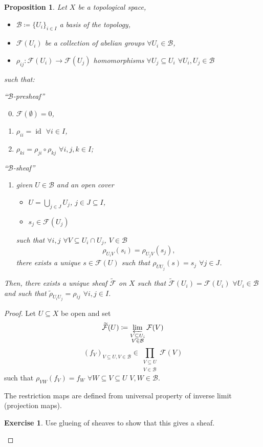 \documentclass[12pt]{article}
\DeclareMathOperator{\id}{id}
\newtheorem*{proposition}{Proposition}
\theoremstyle{definition}
\newtheorem*{exercise}{Exercise}
\theoremstyle{remark}
\begin{document}
\begin{proposition}
Let $X$ be a topological space,
\begin{itemize}
\item $\mathcal{B}\coloneqq\{U_i\}_{i\in I}$ a basis of the topology,
\item $\mathcal{F}(U_i)$ be a collection of abelian groups $\forall U_i\in\mathcal{B}$,
\item $\rho_{ij}:\mathcal{F}(U_i)\rightarrow\mathcal{F}(U_j)$ homomorphisms $\forall U_j\subseteq U_i$ $\forall U_i,U_j\in\mathcal{B}$
\end{itemize}
such that:

``$\mathcal{B}$-presheaf''
\begin{enumerate}[label=\arabic*)]
\setcounter{enumi}{-1}
\item $\mathcal{F}(\emptyset)=0$,
\item $\rho_{ii}=\id$ $\forall i\in I$,
\item $\rho_{ki}=\rho_{ji}\circ\rho_{kj}$ $\forall i,j,k\in I$;
\end{enumerate}
``$\mathcal{B}$-sheaf''
\begin{enumerate}[label=\arabic*),resume]
\item given $U\in\mathcal{B}$ and an open cover
\begin{itemize}[label=$-$]
\item $U=\bigcup_{j\in J}U_j$, $j\in J\subseteq I$,
\item $s_j\in\mathcal{F}(U_j)$
\end{itemize}
such that $\forall i,j$ $\forall V\subseteq U_i\cap U_j$, $V\in\mathcal{B}$
\[\rho_{U_iV}(s_i)=\rho_{U_jV}(s_j),\]
there exists a unique $s\in\mathcal{F}(U)$ such that $\rho_{UU_j}(s)=s_j$ $\forall j\in J$.
\end{enumerate}

Then, there exists a unique sheaf $\widetilde{\mathcal{F}}$ on $X$ such that $\widetilde{\mathcal{F}}(U_i)=\mathcal{F}(U_i)$ $\forall U_i\in\mathcal{B}$ and such that $\widetilde{\rho}_{U_iU_j}=\rho_{ij}$ $\forall i,j\in I$.
\end{proposition}

\begin{proof}
Let $U\subseteq X$ be open and set
\[\widetilde{\mathcal{F}}(U)\coloneqq\varprojlim_{\substack{V\subseteq U_i\\V\in\mathcal{B}}}\mathcal{F}(V)\]
\[(f_V)_{V\subseteq U,V\in\mathcal{B}}\in\prod_{\substack{V\subseteq U\\V\in\mathcal{B}}}\mathcal{F}(V)\]
such that $\rho_{VW}(f_V)=f_W$ $\forall W\subseteq V\subseteq U$ $V,W\in\mathcal{B}$.

The restriction maps are defined from universal property of inverse limit (projection maps).

\begin{exercise}
Use glueing of sheaves to show that this gives a sheaf.
\end{exercise}
\end{proof}
\end{document}
